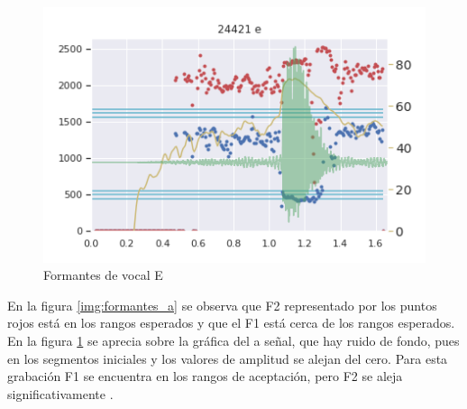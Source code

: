 \begin{figure}[H]
\caption{Formantes de vocal E}
\label{img:formantes_e}
\includegraphics[width=\textwidth]{imagenes/04_02_e.png}
\end{figure}


En la figura \ref{img:formantes_a} se observa que F2 representado por los puntos rojos está en los rangos esperados y que el F1 está cerca de los rangos esperados. En la figura \ref{img:formantes_e} se aprecia sobre la gráfica del a señal, que hay ruido de fondo, pues en los segmentos iniciales y los valores de amplitud se alejan del cero. Para esta grabación F1 se encuentra en los rangos de aceptación, pero F2 se aleja significativamente \cite{Abdel-Hamid2012}.

